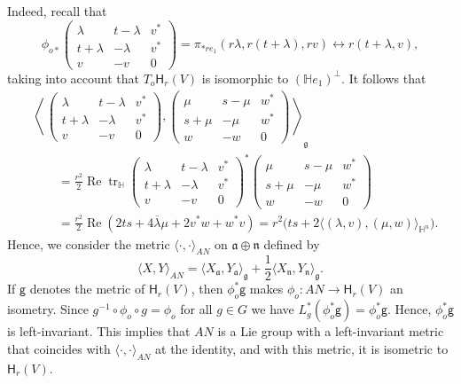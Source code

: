 \documentclass[12pt, a4paper]{amsart}
\newcommand{\g}{\mathfrak}
\newcommand{\tr}{\operatorname{tr}}
\renewcommand{\H}{\mathbb{H}}
\renewcommand{\Re}{\operatorname{Re}}
\theoremstyle{remark}
\begin{document}
Indeed, recall that 
\[
\phi_{o*}\left(
\begin{array}{cc|c}
	\lambda & t-\lambda & v^*\\
	t+\lambda & -\lambda & v^*\\
	\hline
	v & -v & 0
\end{array}
\right)
=\pi_{*re_1}(r\lambda,r(t+\lambda),rv)
\leftrightarrow r(t+\lambda,v),
\]
taking into account that $T_o\mathsf{H}_r(V)$ is isomorphic to $(\H e_1)^\perp$.
It follows that
\[
\begin{aligned}
&\left\langle\,
\left(
\begin{array}{cc|c}
	\lambda & t-\lambda & v^*\\
	t+\lambda & -\lambda & v^*\\
	\hline
	v & -v & 0
\end{array}
\right),
\left(
\begin{array}{cc|c}
	\mu & s-\mu & w^*\\
	s+\mu & -\mu & w^*\\
	\hline
	w & -w & 0
\end{array}
\right)\,
\right\rangle_{\g{g}}\\
&{}\qquad=\frac{r^2}{2}\Re\tr_\H \left(
\begin{array}{cc|c}
	\lambda & t-\lambda & v^*\\
	t+\lambda & -\lambda & v^*\\
	\hline
	v & -v & 0
\end{array}
\right)^*
\left(
\begin{array}{cc|c}
	\mu & s-\mu & w^*\\
	s+\mu & -\mu & w^*\\
	\hline
	w & -w & 0
\end{array}
\right)\\
&{}\qquad=\frac{r^2}{2}\Re(2ts+4\overline{\lambda}\mu+2v^*w+w^*v)
=r^2\bigl(ts+2\langle (\lambda,v),(\mu,w)\rangle_{\H^n}\bigr).
\end{aligned}
\]
Hence, we consider the metric $\langle\cdot,\cdot \rangle_{AN}$ on $\g{a}\oplus\g{n}$ defined by
\[
\langle X,Y \rangle_{AN}
=\langle X_{\g{a}},Y_{\g{a}} \rangle_\g{g}+\frac{1}{2}\langle X_{\g{n}},Y_{\g{n}}\rangle_\g{g}.
\]
If $\mathsf{g}$ denotes the metric of $\mathsf{H}_r(V)$, then $\phi_o^*\mathsf{g}$ makes $\phi_o\colon AN\to \mathsf{H}_r(V)$ an isometry. 
Since $g^{-1}\circ\phi_o\circ g=\phi_o$ for all $g\in G$ we have $L_g^*(\phi_o^*\mathsf{g})=\phi_o^*\mathsf{g}$.
Hence, $\phi_o^*\mathsf{g}$ is left-invariant.
This implies that $AN$ is a Lie group with a left-invariant metric that coincides with $\langle\cdot,\cdot \rangle_{AN}$ at the identity, and with this metric, it is isometric to $\mathsf{H}_r(V)$.
\end{document}
